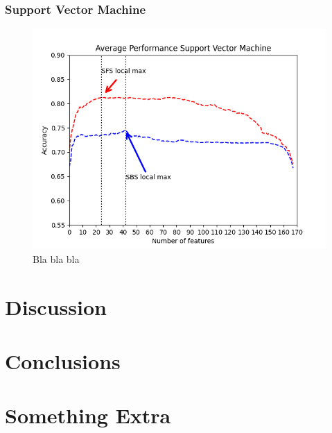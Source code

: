 \documentclass{kththesis}
\begin{document}
\subsection{Support Vector Machine}

\begin{figure}
  \begin{center}
    \includegraphics[scale=0.8]{./figures/Figure_3.png}
    \caption{Bla bla bla}
  \end{center}
\end{figure}

\chapter{Discussion}
\blindtext

\chapter{Conclusions}
\blindtext

\printbibliography[heading=bibintoc]

\appendix

\chapter{Something Extra}

\tailmatter
\end{document}
